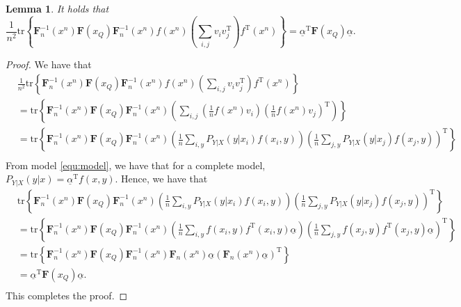 \documentclass{article} %
\theoremstyle{plain} %
\newtheorem{lemma}[theorem]{Lemma}          %
\begin{document}
\begin{lemma}\label{lem:aFa_comple}
It holds that
\begin{equation*}
    \frac1{n^2}\mathrm{tr}\left\{ \mathbf{F}_n^{-1}(x^n)\mathbf{F}(x_Q)\mathbf{F}_n^{-1}(x^n) f(x^n)\left(\sum_{i,j}v_iv_j^\mathrm{T}\right) f^\mathrm{T}(x^n)\right\}  = \underline{\alpha}^{\mathrm{T}} \mathbf{F}(x_Q)\underline{\alpha}.
\end{equation*}
\end{lemma}
\begin{proof}
We have that
\begin{align*}
& \frac1{n^2}\mathrm{tr}\left\{ \mathbf{F}_n^{-1}(x^n)\mathbf{F}(x_Q)\mathbf{F}_n^{-1}(x^n) f(x^n)\left(\sum_{i,j}v_iv_j^\mathrm{T}\right) f^\mathrm{T}(x^n)\right\}\\
& = \mathrm{tr}\left\{ \mathbf{F}_n^{-1}(x^n)\mathbf{F}(x_Q)\mathbf{F}_n^{-1}(x^n)\left(\sum_{i,j}\left(\frac1n f(x^n) v_i\right)\left(\frac1n f(x^n) v_j\right)^\mathrm{T}\right)\right\}\\
& = \mathrm{tr}\left\{ \mathbf{F}_n^{-1}(x^n)\mathbf{F}(x_Q)\mathbf{F}_n^{-1}(x^n)\left(\frac1n\sum_{i,y}P_{Y|X}(y|x_i) f(x_i, y)\right)\left(\frac1n\sum_{j,y}P_{Y|X}(y|x_j) f(x_j,y)\right)^\mathrm{T}\right\}\\
\end{align*}
From model \ref{equ:model}, we have that for a complete model, $P_{Y|X}(y|x) = \underline{\alpha}^\mathrm{T}f(x,y)$. Hence, we have that
\begin{align*}
& \mathrm{tr}\left\{ \mathbf{F}_n^{-1}(x^n)\mathbf{F}(x_Q)\mathbf{F}_n^{-1}(x^n)\left(\frac1n\sum_{i,y}P_{Y|X}(y|x_i) f(x_i, y)\right)\left(\frac1n\sum_{j,y} P_{Y|X}(y|x_j)f(x_j,y)\right)^\mathrm{T}\right\}\\
& = \mathrm{tr}\left\{\mathbf{F}_n^{-1}(x^n) \mathbf{F}(x_Q)\mathbf{F}_n^{-1}(x^n)\left(\frac1n\sum_{i,y} f(x_i, y)f^\mathrm{T}(x_i, y) \underline{\alpha} \right)\left(\frac1n\sum_{j,y} f(x_j,y)f^\mathrm{T}(x_j,y)\underline{\alpha}\right)^\mathrm{T}\right\}\\
& = \mathrm{tr}\left\{\mathbf{F}_n^{-1}(x^n) \mathbf{F}(x_Q)\mathbf{F}_n^{-1}(x^n)\mathbf{F}_n(x^n) \underline{\alpha} \left(\mathbf{F}_n(x^n)\underline{\alpha}\right)^\mathrm{T}\right\}\\
& = \underline{\alpha}^\mathrm{T}\mathbf{F}(x_Q) \underline{\alpha} .\\
\end{align*}
This completes the proof.
\end{proof}
\end{document}

